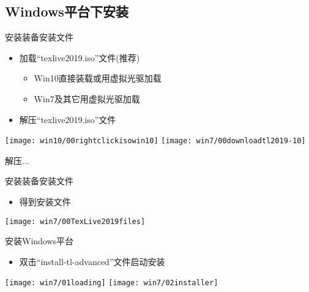 \documentclass[fontset = none, t]{ctexbeamer}
\begin{document}
\subsection[Windows平台]{Windows平台下安装\tl}
\begin{frame}{安装\tl}{装备安装文件}
  \begin{spacing}{1.0}
    \begin{itemize}
    \item 加载\enquote{texlive2019.iso}文件(\alert{推荐})
      \begin{itemize}
      \item Win10直接装载或用虚拟光驱加载
      \item Win7及其它用虚拟光驱加载
      \end{itemize}      
    \item 解压\enquote{texlive2019.iso}文件
    \end{itemize}
  \begin{center}
    \texttt{[image: win10/00rightclickisowin10]}
    \texttt{[image: win7/00downloadtl2019-10]}
  \end{center}
  \end{spacing}
\end{frame}

\begin{frame}
  解压...
\end{frame}

\begin{frame}{安装\tl}{装备安装文件}
  \begin{spacing}{1.0}
    \begin{itemize}
    \item 得到\alert{安装文件}
    \end{itemize}  
  \begin{center}    
    \texttt{[image: win7/00TexLive2019files]}
  \end{center}
  \end{spacing}
\end{frame}

\begin{frame}{安装\tl}{Windows平台}
  \begin{spacing}{1.0}
    \begin{itemize}
    \item 双击\enquote{install-tl-advanced}文件启动\TeXLive 安装
    \end{itemize}  
  \begin{center}    
    \texttt{[image: win7/01loading]}
    \texttt{[image: win7/02installer]}
  \end{center}
  \end{spacing}
\end{frame}
\end{document}
